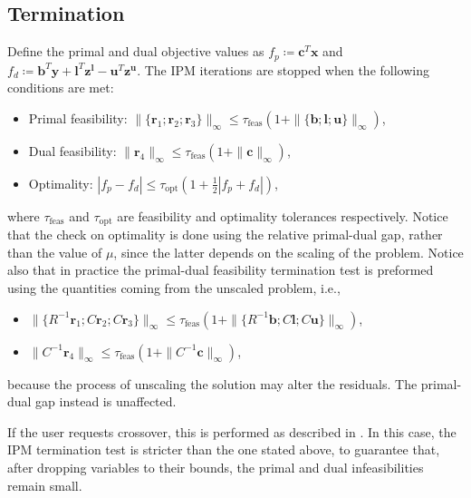 \documentclass[a4paper]{article}
\newcommand{\bvec}{\mathbf b}
\newcommand{\cvec}{\mathbf c}
\newcommand{\lvec}{\mathbf l}
\newcommand{\rvec}{\mathbf r}
\newcommand{\uvec}{\mathbf u}
\newcommand{\xvec}{\mathbf x}
\newcommand{\yvec}{\mathbf y}
\newcommand{\zl}{\mathbf {z^l}}
\newcommand{\zu}{\mathbf {z^u}}
\newcommand{\0}{\mathbf 0}
\begin{document}
\subsection{Termination}

Define the primal and dual objective values as $f_p \coloneqq \cvec^T\xvec$ and $f_d\coloneqq \bvec^T\yvec+ \lvec^T\zl - \uvec^T\zu$. The IPM iterations are stopped when the following conditions are met:
\begin{itemize}
\item Primal feasibility: $\|\{\rvec_1; \rvec_2; \rvec_3\}\|_\infty \le \tau_\text{feas} (1+\|\{\bvec;\lvec;\uvec\}\|_\infty)$,
\item Dual feasibility: $\|\rvec_4\|_\infty \le \tau_\text{feas} (1+\|\cvec\|_\infty)$,
\item Optimality: $|f_p - f_d| \le \tau_\text{opt} (1+\frac{1}{2}|f_p+f_d|)$,
\end{itemize}
where $\tau_\text{feas}$ and $\tau_\text{opt}$ are feasibility and optimality tolerances respectively. Notice that the check on optimality is done using the relative primal-dual gap, rather than the value of $\mu$, since the latter depends on the scaling of the problem. Notice also that in practice the primal-dual feasibility termination test is preformed using the quantities coming from the unscaled problem, i.e.,
\begin{itemize}
\item $\|\{R^{-1}\rvec_1; C\rvec_2; C\rvec_3\}\|_\infty \le \tau_\text{feas} (1+\|\{R^{-1}\bvec;C\lvec;C\uvec\}\|_\infty)$,
\item $\|C^{-1}\rvec_4\|_\infty \le \tau_\text{feas} (1+\|C^{-1}\cvec\|_\infty)$,
\end{itemize}
because the process of unscaling the solution may alter the residuals. The primal-dual gap instead is unaffected.

If the user requests crossover, this is performed as described in \cite{SchGon:basisIPM}. In this case, the IPM termination test is stricter than the one stated above, to guarantee that, after dropping variables to their bounds, the primal and dual infeasibilities remain small.
\end{document}
